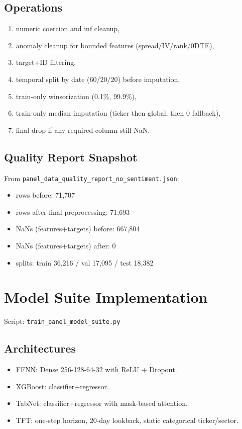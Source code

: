 \documentclass[11pt]{article}
\begin{document}
\subsection{Operations}
\begin{enumerate}[leftmargin=1.2em]
  \item numeric coercion and inf cleanup,
  \item anomaly cleanup for bounded features (spread/IV/rank/0DTE),
  \item target+ID filtering,
  \item temporal split by date (60/20/20) before imputation,
  \item train-only winsorization (0.1\%, 99.9\%),
  \item train-only median imputation (ticker then global, then 0 fallback),
  \item final drop if any required column still NaN.
\end{enumerate}

\subsection{Quality Report Snapshot}
From \texttt{panel\_data\_quality\_report\_no\_sentiment.json}:
\begin{itemize}[leftmargin=1.2em]
  \item rows before: 71{,}707
  \item rows after final preprocessing: 71{,}693
  \item NaNs (features+targets) before: 667{,}804
  \item NaNs (features+targets) after: 0
  \item splits: train 36{,}216 / val 17{,}095 / test 18{,}382
\end{itemize}

\section{Model Suite Implementation}
Script: \texttt{train\_panel\_model\_suite.py}

\subsection{Architectures}
\begin{itemize}[leftmargin=1.2em]
  \item FFNN: Dense 256-128-64-32 with ReLU + Dropout.
  \item XGBoost: classifier+regressor.
  \item TabNet: classifier+regressor with mask-based attention.
  \item TFT: one-step horizon, 20-day lookback, static categorical ticker/sector.
\end{itemize}
\end{document}
